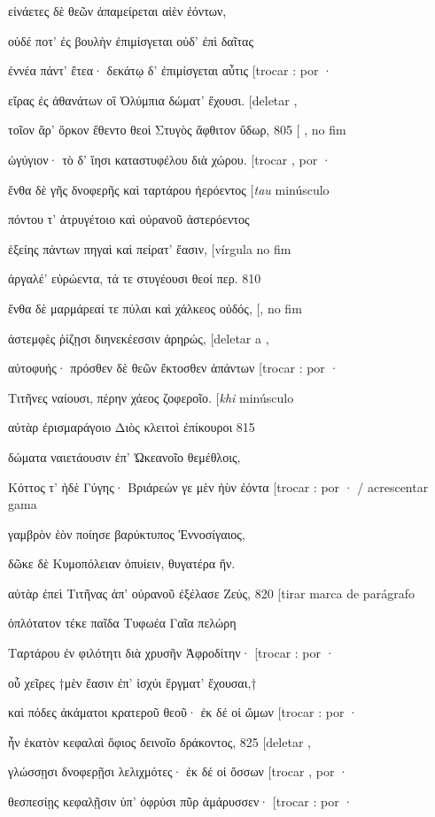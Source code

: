 εἰνάετες δὲ θεῶν ἀπαμείρεται αἰὲν ἐόντων,

οὐδέ ποτ' ἐς βουλὴν ἐπιμίσγεται οὐδ' ἐπὶ δαῖτας

ἐννέα πάντ' ἔτεα· δεκάτῳ δ' ἐπιμίσγεται αὖτις {[}trocar : por ·

εἴρας ἐς ἀθανάτων οἳ Ὀλύμπια δώματ' ἔχουσι. {[}deletar ,

τοῖον ἄρ' ὅρκον ἔθεντο θεοὶ Στυγὸς ἄφθιτον ὕδωρ, 805 {[} , no fim

ὠγύγιον· τὸ δ' ἵησι καταστυφέλου διὰ χώρου. {[}trocar , por ·

ἔνθα δὲ γῆς δνοφερῆς καὶ ταρτάρου ἠερόεντος {[}\emph{tau} minúsculo

πόντου τ' ἀτρυγέτοιο καὶ οὐρανοῦ ἀστερόεντος

ἑξείης πάντων πηγαὶ καὶ πείρατ' ἔασιν, {[}vírgula no fim

ἀργαλέ' εὐρώεντα, τά τε στυγέουσι θεοί περ. 810

ἔνθα δὲ μαρμάρεαί τε πύλαι καὶ χάλκεος οὐδός, {[}, no fim

ἀστεμφὲς ῥίζῃσι διηνεκέεσσιν ἀρηρώς, {[}deletar a ,

αὐτοφυής· πρόσθεν δὲ θεῶν ἔκτοσθεν ἁπάντων {[}trocar : por ·

Τιτῆνες ναίουσι, πέρην χάεος ζοφεροῖο. {[}\emph{khi} minúsculo

αὐτὰρ ἐρισμαράγοιο Διὸς κλειτοὶ ἐπίκουροι 815

δώματα ναιετάουσιν ἐπ' Ὠκεανοῖο θεμέθλοις,

Κόττος τ' ἠδὲ Γύγης· Βριάρεών γε μὲν ἠὺν ἐόντα {[}trocar : por · /
acrescentar gama

γαμβρὸν ἑὸν ποίησε βαρύκτυπος Ἐννοσίγαιος,

δῶκε δὲ Κυμοπόλειαν ὀπυίειν, θυγατέρα ἥν.

αὐτὰρ ἐπεὶ Τιτῆνας ἀπ' οὐρανοῦ ἐξέλασε Ζεύς, 820 {[}tirar marca de
parágrafo

ὁπλότατον τέκε παῖδα Τυφωέα Γαῖα πελώρη

Ταρτάρου ἐν φιλότητι διὰ χρυσῆν Ἀφροδίτην· {[}trocar : por ·

οὗ χεῖρες †μὲν ἔασιν ἐπ' ἰσχύι ἔργματ' ἔχουσαι,†

καὶ πόδες ἀκάματοι κρατεροῦ θεοῦ· ἐκ δέ οἱ ὤμων {[}trocar : por ·

ἦν ἑκατὸν κεφαλαὶ ὄφιος δεινοῖο δράκοντος, 825 {[}deletar ,

γλώσσῃσι δνοφερῇσι λελιχμότες· ἐκ δέ οἱ ὄσσων {[}trocar , por ·

θεσπεσίῃς κεφαλῇσιν ὑπ' ὀφρύσι πῦρ ἀμάρυσσεν· {[}trocar : por ·

